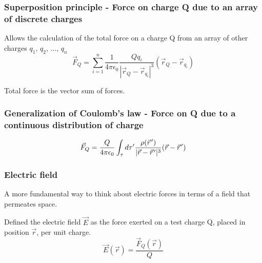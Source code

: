 \documentclass[english,11pt]{article}
\newcommand{\pvec}[1]{\vec{#1}\mkern2mu\vphantom{#1}}
\begin{document}
\subsubsection*{\bf Superposition principle - Force on charge Q due to an array of discrete charges}
    \begin{itemize}
    {\small
       \item Allows the calculation of the total force on a charge Q
             from an array of other charges $q_1$, $q_2$, ..., $q_n$
        \begin{equation*}
         \vec{F}_{Q} = \sum_{i=1}^{n} \frac{1}{4\pi\epsilon_0}
            \frac{Q q_i}{|\vec{r}_{Q}-\vec{r}_{q_{i}}|^{3}} (\vec{r}_{Q}-\vec{r}_{q_{i}})
         \end{equation*}
       \item Total force is the vector sum of forces.
    }
    \end{itemize}

\subsubsection*{\bf Generalization of Coulomb's law - Force on Q due to a continuous distribution of charge}
      {\small
         \begin{equation*}
            \vec{F}_{Q} = \frac{Q}{4\pi\epsilon_0} \int_{\tau}
               d\tau^{\prime} \frac{\rho({\pvec{r}'})}{|\vec{r}-\pvec{r}'|^{3}} (\vec{r}-\pvec{r}')
         \end{equation*}
      }

\subsubsection*{\bf Electric field}
        \begin{itemize}
        {\small
           \item A more fundamental way to think about electric forces in terms of a field that permeates space.
           \item Defined the electric field $\vec{E}$
                 as the force exerted on a test charge Q, placed in position $\vec{r}$, per unit charge.
            \begin{equation*}
              \vec{E}(\vec{r}) = \frac{\vec{F}_Q(\vec{r})}{Q}
            \end{equation*}
        }
        \end{itemize}
\end{document}

